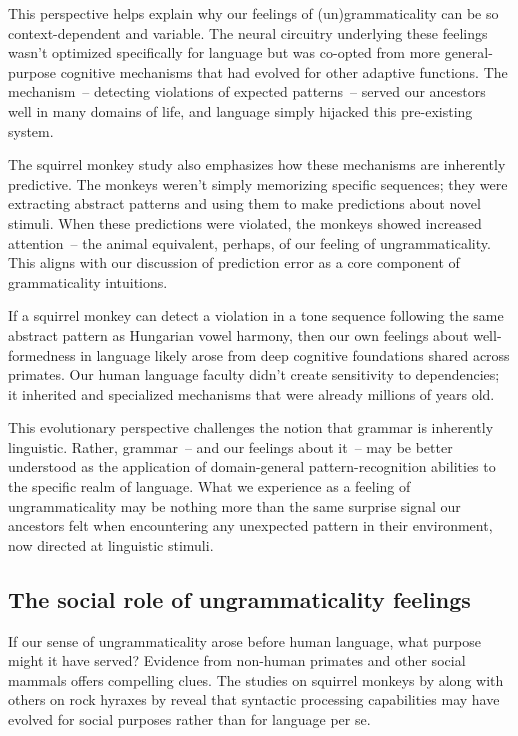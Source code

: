 This perspective helps explain why our feelings of (un)grammaticality can be so context-dependent and variable. The neural circuitry underlying these feelings wasn't optimized specifically for language but was co-opted from more general-purpose cognitive mechanisms that had evolved for other adaptive functions. The mechanism~-- detecting violations of expected patterns~-- served our ancestors well in many domains of life, and language simply hijacked this pre-existing system.

The squirrel monkey study also emphasizes how these mechanisms are inherently predictive. The monkeys weren't simply memorizing specific sequences; they were extracting abstract patterns and using them to make predictions about novel stimuli. When these predictions were violated, the monkeys showed increased attention~-- the animal equivalent, perhaps, of our feeling of ungrammaticality. This aligns with our discussion of prediction error as a core component of grammaticality intuitions.

If a squirrel monkey can detect a violation in a tone sequence following the same abstract pattern as Hungarian vowel harmony, then our own feelings about well-formedness in language likely arose from deep cognitive foundations shared across primates. Our human language faculty didn't create sensitivity to dependencies; it inherited and specialized mechanisms that were already millions of years old.

This evolutionary perspective challenges the notion that grammar is inherently linguistic. Rather, grammar~-- and our feelings about it~-- may be better understood as the application of domain-general pattern-recognition abilities to the specific realm of language. What we experience as a feeling of ungrammaticality may be nothing more than the same surprise signal our ancestors felt when encountering any unexpected pattern in their environment, now directed at linguistic stimuli.

\subsection{The social role of ungrammaticality feelings}

If our sense of ungrammaticality arose before human language, what purpose might it have served? Evidence from non-human primates and other social mammals offers compelling clues. The studies on squirrel monkeys by \citet{Ravignani2013} along with others on rock hyraxes by \citet{Kershenbaum2012} reveal that syntactic processing capabilities may have evolved for social purposes rather than for language per se.

